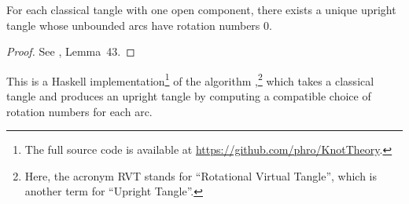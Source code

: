 \begin{lemma}
        For each classical tangle with one open component, there exists a unique
        upright tangle whose unbounded arcs have rotation numbers $0$.
\end{lemma}
\begin{proof}
        See \cite{BV}, Lemma~43.
\end{proof}

This is a Haskell implementation\footnote{The full source code is available at
\url{https://github.com/phro/KnotTheory}.} of the algorithm ,\footnote{Here, the
acronym RVT stands for \enquote{Rotational Virtual Tangle}, which is
another term for \enquote{Upright Tangle}.} which takes a classical tangle and
produces an upright tangle by computing a compatible choice of rotation numbers
for each arc.


